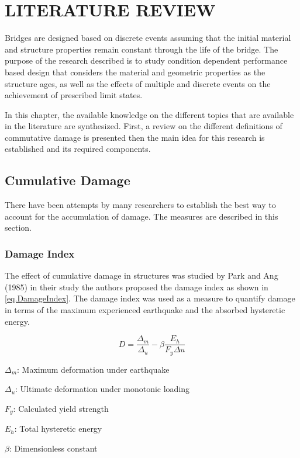 \chapter{LITERATURE REVIEW}
\label{chap-two}
Bridges are designed based on discrete events assuming that the initial material and structure properties remain constant through the life of the bridge. The purpose of the research described is to study condition dependent performance based design that considers the material and geometric properties as the structure ages, as well as the effects of multiple and discrete events on the achievement of prescribed limit states.

In this chapter, the available knowledge on the different topics that are available in the literature are synthesized. First, a review on the different definitions of commutative damage is presented then the main idea for this research is established and its required components.

\section{Cumulative Damage}

There have been attempts by many researchers to establish the best way to account for the accumulation of damage. The measures are described in this section.

\subsection{Damage Index}
The effect of cumulative damage in structures was studied by Park and Ang (1985) \cite{Young-JiPark1985} in their study the authors proposed the damage index as shown in \ref{eq.DamageIndex}. The damage index was used as a measure to quantify damage in terms of the maximum experienced earthquake and the absorbed hysteretic energy.

\begin{equation}
  D=\frac{\Delta_{m}}{\Delta_{u}}-\beta \frac{E_h}{F_{y}\Delta{u}}
  \label{eq.DamageIndex}
\end{equation} 

$\Delta_{m}$: Maximum deformation under earthquake

$\Delta_{u}$: Ultimate deformation under monotonic loading

$F_{y}$: Calculated yield strength

$E_{h}$: Total hysteretic energy

$\beta$: Dimensionless constant 

